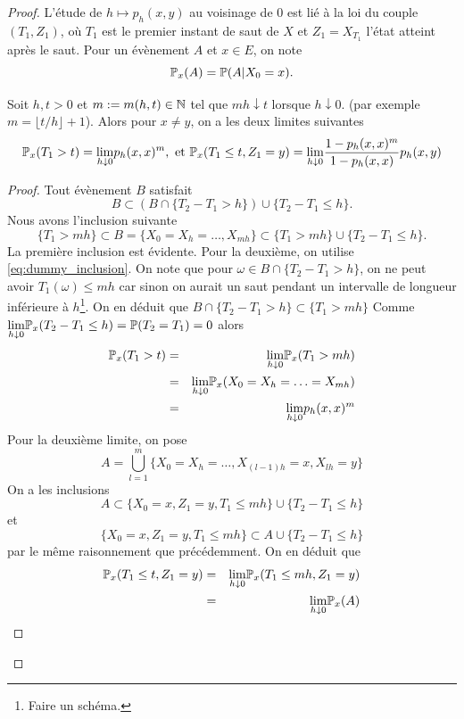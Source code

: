 \begin{proof}
L'étude de $h\mapsto p_h(x,y)$ au voisinage de $0$ est lié à la loi du couple $(T_1, Z_1)$, où $T_1$ est le premier instant de saut de $X$ et $Z_1 = X_{T_1}$ l'état atteint après le saut. Pour un évènement $A$ et $x\in E$, on note 
$$
\mathbb{P}_x(A) = \mathbb{P}(A|X_0  = x).
$$
\begin{lemma}\label{lem:T_Z}
Soit $h,t>0$ et $m:=m(h,t)\in \mathbb{N}$ tel que $mh\downarrow t$ lorsque $h\downarrow0$. (par exemple $m = \lfloor t/h\rfloor+1$). Alors pour $x\neq y$, on a les deux limites suivantes
$$
\mathbb{P}_x( T_1>t) = \underset{h\downarrow 0}{\lim} p_h(x,x)^m
,\text{ et }\mathbb{P}_x(T_1\leq t, Z_1 = y) = \underset{h\downarrow0}{\lim}\frac{1-p_h(x,x)^m}{1-p_h(x,x)}p_h(x,y)
$$
\end{lemma}
\begin{proof}
Tout évènement $B$ satisfait 
\begin{equation}\label{eq:dummy_inclusion}
B\subset(B\cap\{T_2-T_1 > h\})\cup\{T_2 - T_1 \leq h\}.
\end{equation}
Nous avons l'inclusion suivante 
$$
\{T_1 >mh\}\subset B = \{X_0 = X_{h} = \ldots, X_{mh}\}\subset\{T_1>mh\}\cup \{T_2 - T_1\leq h\}.
$$
La première inclusion est évidente. Pour la deuxième, on utilise \eqref{eq:dummy_inclusion}. On note que pour $\omega\in B\cap\{T_2-T_1 > h\}$, on ne peut avoir $T_1(\omega)\leq mh$ car sinon on aurait un saut pendant un intervalle de longueur inférieure à $h$\footnote{Faire un schéma.}. On en déduit que $B\cap\{T_2-T_1>h\}\subset\{T_1 > mh\}$ Comme $\underset{h\downarrow 0}{\lim}\mathbb{P}_x(T_2 - T_1\leq h) = \mathbb{P}(T_2 = T_1) = 0$ alors 
\begin{eqnarray*}
\mathbb{P}_x(T_1>t) &=&\underset{h\downarrow 0}{\lim}\mathbb{P}_x(T_1>mh)\\
&=&\underset{h\downarrow 0}{\lim}\mathbb{P}_x(X_0 = X_h = \ldots = X_{mh})\\
&=&\underset{h\downarrow 0}{\lim}p_h(x,x)^m\\
\end{eqnarray*}
Pour la deuxième limite, on pose 
$$
A = \bigcup_{l = 1}^m\{X_0 = X_h = \ldots, X_{(l-1)h} = x,X_{lh}=y\}
$$ 
On a les inclusions
$$
A\subset\{X_0 = x,Z_1 = y, T_1\leq mh\}\cup\{T_2-T_1 \le h\}
$$
et
$$
\{X_0 = x,Z_1 = y, T_1\leq mh\}\subset A\cup\{T_2-T_1 \le h\}
$$ 
par le même raisonnement que précédemment. On en déduit que 
\begin{eqnarray*}
\Prob_x(T_1\leq t, Z_1 = y)&=&\underset{h\downarrow 0}{\lim} \Prob_x(T_1\leq mh, Z_1 = y)\\
&=&\underset{h\downarrow 0}{\lim} \Prob_x(A)\\

\end{eqnarray*}
\end{proof}
\end{proof}
